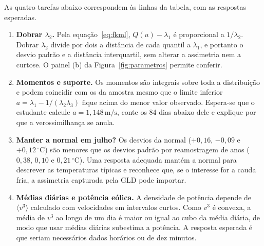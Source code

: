 As quatro tarefas abaixo correspondem às linhas da tabela, com as respostas esperadas.

\begin{enumerate}
    \item \textbf{Dobrar $\lambda_2$.} Pela equação~\eqref{eq:fkml}, $Q(u) - \lambda_1$ é proporcional a $1/\lambda_2$. Dobrar $\lambda_2$ divide por dois a distância de cada quantil a $\lambda_1$, e portanto o desvio padrão e a distância interquartil, sem alterar a assimetria nem a curtose. O painel (b) da Figura~\ref{fig:parametros} permite conferir.
    \item \textbf{Momentos e suporte.} Os momentos são integrais sobre toda a distribuição e podem coincidir com os da amostra mesmo que o limite inferior $a = \lambda_1 - 1/(\lambda_2\lambda_3)$ fique acima do menor valor observado. Espera-se que o estudante calcule $a = 1,148\,\text{m/s}$, conte os 84 dias abaixo dele e explique por que a verossimilhança se anula.
    \item \textbf{Manter a normal em julho?} Os desvios da normal ($+0,16$, $-0,09$ e $+0,12\,^\circ$C) são menores que os desvios padrão por reamostragem de anos ($0,38$, $0,10$ e $0,21\,^\circ$C). Uma resposta adequada mantém a normal para descrever as temperaturas típicas e reconhece que, se o interesse for a cauda fria, a assimetria capturada pela GLD pode importar.
    \item \textbf{Médias diárias e potência eólica.} A densidade de potência depende de $\langle v^3\rangle$ calculado com velocidades em intervalos curtos. Como $v^3$ é convexa, a média de $v^3$ ao longo de um dia é maior ou igual ao cubo da média diária, de modo que usar médias diárias subestima a potência. A resposta esperada é que seriam necessários dados horários ou de dez minutos.
\end{enumerate}
\par

